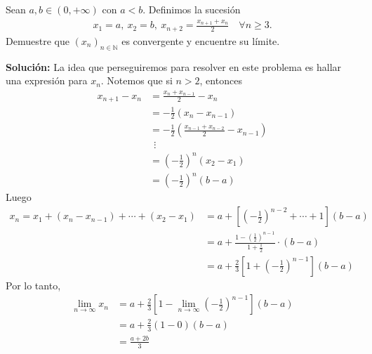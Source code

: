 \documentclass[12pt]{book}
\begin{document}
\begin{prob}{}{}
    Sean $a,b \in (0, +\infty)$ con $a<b$. Definimos la sucesión
    \begin{align*}
        x_1=a, \ x_2=b, \ x_{n+2}=\frac{x_{n+1}+x_n}{2} \quad \forall n \geq 3.
    \end{align*}
    Demuestre que $(x_n)_{n \in \mathbb{N}}$ es convergente y encuentre su límite.
\end{prob}
\textbf{Solución:}
La idea que perseguiremos para resolver en este problema es hallar una expresión para $x_n$. Notemos que si $n>2$, entonces
\begin{align*}
    x_{n+1}-x_n&=\frac{x_n+x_{n-1}}{2}-x_n \\
    &=-\frac{1}{2}(x_n-x_{n-1}) \\
    &= -\frac{1}{2}\left(\frac{x_{n-1}+x_{n-2}}{2}-x_{n-1}\right) \\
    & \ \ \vdots \\
    &=\left(-\frac{1}{2} \right)^n(x_2-x_1) \\
    &=\left(-\frac{1}{2} \right)^n(b-a) 
\end{align*}
Luego 
\begin{align*}
    x_n=x_1+(x_n-x_{n-1})+ \cdots + (x_2-x_1) &= a+ \left[\left(-\frac{1}{2}\right)^{n-2}+ \cdots + 1 \right](b-a) \\
    &= a+ \frac{1-\left(\frac{1}{2}\right)^{n-1}}{1+ \frac{1}{2}}\cdot (b-a) \\
    &= a+ \frac{2}{3}\left[1+\left(-\frac{1}{2} \right)^{n-1} \right](b-a)
\end{align*}
Por lo tanto,
\begin{align*}
    \lim_{n \to \infty} x_n&=a+\frac{2}{3}\left[ 1-\lim_{n \to \infty}\left(-\frac{1}{2}\right)^{n-1} \right](b-a) \\
    &= a+ \frac{2}{3}(1-0)(b-a) \\
    &=\frac{a+2b}{3}
\end{align*}
\end{document}
